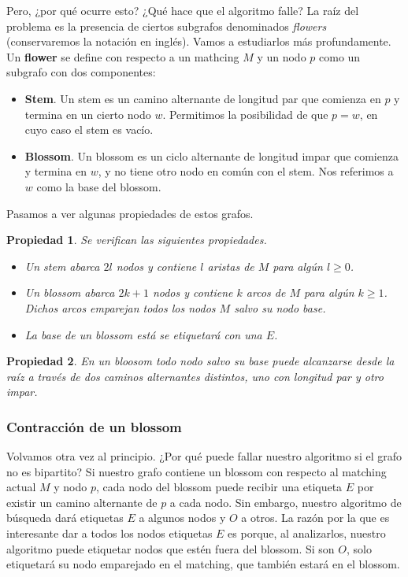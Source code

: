 \documentclass[twoside,12pt]{article}
\newtheorem{prop}{Propiedad}[section]
\begin{document}
Pero, ¿por qué ocurre esto? ¿Qué hace que el algoritmo falle? La raíz del problema es la presencia de ciertos subgrafos denominados \textit{flowers} (conservaremos la notación en inglés). Vamos a estudiarlos más profundamente. Un \textbf{flower} se define con respecto a un mathcing $M$ y un nodo $p$ como un subgrafo con dos componentes:
\begin{itemize}
\item \textbf{Stem}. Un stem es un camino alternante de longitud par que comienza en $p$ y termina en un cierto nodo $w$. Permitimos la posibilidad de que $p=w$, en cuyo caso el stem es vacío.
\item \textbf{Blossom}. Un blossom es un ciclo alternante de longitud impar que comienza y termina en $w$, y no tiene otro nodo en común con el stem. Nos referimos a $w$ como la base del blossom.
\end{itemize}
Pasamos a ver algunas propiedades de estos grafos.
\begin{prop}Se verifican las siguientes propiedades.
\begin{itemize}
\item Un stem abarca $2l$ nodos y contiene $l$ aristas de $M$ para algún $l\geq 0$. 
\item Un blossom abarca $2k+1$ nodos y contiene $k$ arcos de $M$ para algún $k\geq1$. Dichos arcos emparejan todos los nodos $M$ salvo su nodo base.  
\item La base de un blossom está se etiquetará con una $E$. 
\end{itemize}
\end{prop}

\begin{prop}
En un  bloosom todo nodo salvo su base puede alcanzarse desde la raíz a través de dos caminos alternantes distintos, uno con longitud par y otro impar.
\end{prop}
\subsubsection{Contracción de un blossom}
Volvamos otra vez al principio. ¿Por qué puede fallar nuestro algoritmo si el grafo no es bipartito? Si nuestro grafo contiene un blossom con respecto al matching actual $M$ y nodo $p$, cada nodo del blossom puede recibir una etiqueta $E$ por existir un camino alternante de $p$ a cada nodo. Sin embargo, nuestro algoritmo de búsqueda dará etiquetas $E$ a algunos nodos y $O$ a otros. La razón por la que es interesante dar a todos los nodos etiquetas $E$ es porque, al analizarlos, nuestro algoritmo puede etiquetar nodos que estén fuera del blossom. Si son $O$, solo etiquetará su nodo emparejado en el matching, que también estará en el blossom. 
\end{document}
